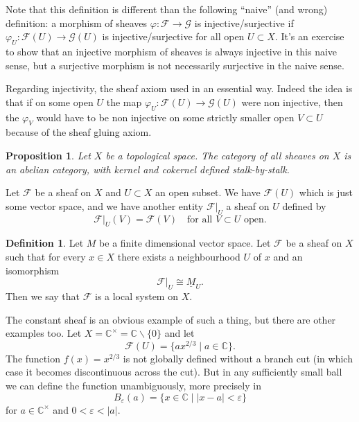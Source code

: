 \documentclass[12pt]{article}
\theoremstyle{plain}
\newtheorem{prop}[thm]{Proposition}
\theoremstyle{definition}
\newtheorem{defn}{Definition}[section]
\numberwithin{equation}{section}
\newcommand{\C}{\mathbb{C}}
\newcommand{\CF}{\mathcal{F}}
\newcommand{\CG}{\mathcal{G}}
\begin{document}
Note that this definition is different than the following ``naive'' (and wrong) definition: a morphism of sheaves $\varphi : \CF \rightarrow \CG$ is injective/surjective if $\varphi_U : \CF(U) \rightarrow \CG(U)$ is injective/surjective for all open $U \subset X$. It's an exercise to show that an injective morphism of sheaves is always injective in this naive sense, but a surjective morphism is not necessarily surjective in the naive sense.

Regarding injectivity, the sheaf axiom used in an essential way. Indeed the idea is that if on some open $U$ the map $\varphi_U : \CF(U) \rightarrow \CG(U)$ were non injective, then the $\varphi_V$ would have to be non injective on some strictly smaller open $V \subset U$ because of the sheaf gluing axiom.

\begin{prop}
Let $X$ be a topological space. The category of all sheaves on $X$ is an abelian category, with kernel and cokernel defined stalk-by-stalk.
\end{prop}

Let $\CF$ be a sheaf on $X$ and $U \subset X$ an open subset. We have $\CF(U)$ which is just some vector space, and we have another entity $\CF|_{U}$ a sheaf on $U$ defined by
\[
\CF|_{U}(V) = \CF(V) \quad \text{for all $V \subset U$ open}.
\]


\begin{defn}
Let $M$ be a finite dimensional vector space. Let $\CF$ be a sheaf on $X$ such that for every $x \in X$ there exists a neighbourhood $U$ of $x$ and an isomorphism
\[
\CF|_U \cong \underline{M}_U.
\]
Then we say that $\CF$ is a local system on $X$.
\end{defn}

The constant sheaf is an obvious example of such a thing, but there are other examples too. Let $X = \C^\times = \C \backslash \{0\}$ and let
\[
\CF(U) = \{a x^{2/3} \mid a \in \C\}.
\]
The function $f(x) = x^{2/3}$ is not globally defined without a branch cut (in which case it becomes discontinuous across the cut). But in any sufficiently small ball we can define the function unambiguously, more precisely in
\[
B_\varepsilon(a) = \{x \in \C \mid |x-a| < \varepsilon\}
\]
for $a \in \C^\times$ and $0 < \varepsilon < |a|$.
\end{document}

